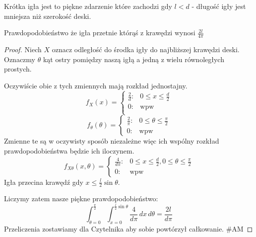 \begin{definition}
    Krótka igła jest to piękne zdarzenie które zachodzi gdy \(l < d\) - długość igły jest mniejsza niż szerokość deski.
\end{definition}

\begin{theorem}
    Prawdopodobieństwo że igła przetnie którąś z krawędzi wynosi \(\frac{2l}{4\pi}\)
\end{theorem}

\begin{proof}
    Niech \(X\) oznacz odległość do środka igły do najbliższej krawędzi deski. Oznaczmy \(\theta\) kąt ostry pomiędzy naszą igłą a jedną z wielu równoległych prostych.
    
    Oczywiście obie z tych zmiennych mają rozkład jednostajny.
    \[
        f_X(x) = 
        \begin{cases}
            \frac{2}{d}: & 0 \leq x \leq \frac{d}{2} \\
            0: & \text{wpw}\\
        \end{cases}
    \]
    \[
        f_\theta(\theta) = 
        \begin{cases}
            \frac{2}{\pi}: & 0 \leq \theta \leq \frac{\pi}{2} \\
            0: & \text{wpw}
        \end{cases}
    \]
    Zmienne te są w oczywisty sposób niezależne więc ich wspólny rozkład prawdopodobieństwa będzie ich iloczynem.
    \[
        f_{X\theta}(x, \theta) = 
        \begin{cases}
            \frac{4}{d\pi}: & 0 \leq x \leq \frac{d}{2}, 0 \leq \theta \leq \frac{\pi}{2}  \\
            0: & \text{wpw}
        \end{cases}
    \]
    Igła przecina krawędź gdy \(x \leq \frac{l}{2}\sin{\theta}\).
    
    Liczymy zatem nasze piękne prawdopodobieństwo:
    \[
        \int_{\theta=0}^{\frac{\pi}{2}} \int_{x=0}^{\frac{l}{2}\sin{\theta}} \frac{4}{d\pi} \, dx\, d\theta = \frac{2l}{d\pi}
    \]
    Przeliczenia zostawiamy dla Czytelnika aby sobie powtórzył całkowanie. \#AM
\end{proof}